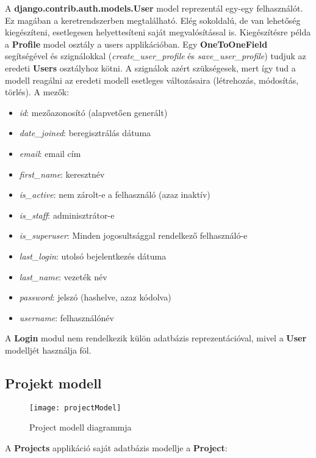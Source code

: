 A \textbf{django.contrib.auth.models.User} model reprezentál egy-egy felhasználót. Ez magában a keretrendszerben megtalálható. Elég sokoldalú, de van lehetőség kiegészíteni, esetlegesen helyettesíteni saját megvalósítással is. Kiegészítésre példa a \textbf{Profile} model osztály a users applikációban. Egy \textbf{OneToOneField} segítségével és szignálokkal (\textit{create\_user\_profile} és \textit{save\_user\_profile}) tudjuk az eredeti \textbf{Users} osztályhoz kötni. A szignálok azért szükségesek, mert így tud a modell reagálni az eredeti modell esetleges változásaira (létrehozás, módosítás, törlés). A mezők:

\begin{itemize}
	\item \textit{id}: mezőazonosító (alapvetően generált)
	\item \textit{date\_joined}: beregisztrálás dátuma
	\item \textit{email}: email cím
	\item \textit{first\_name}: keresztnév
	\item \textit{is\_active}: nem zárolt-e a felhasználó (azaz inaktív)
	\item \textit{is\_staff}: adminisztrátor-e
	\item \textit{is\_superuser}: Minden jogosultsággal rendelkező felhasználó-e
	\item \textit{last\_login}: utolsó bejelentkezés dátuma
	\item \textit{last\_name}: vezeték név
	\item \textit{password}: jelszó (hashelve, azaz kódolva)
	\item \textit{username}: felhasználónév
\end{itemize}

A \textbf{Login} modul nem rendelkezik külön adatbázis reprezentációval, mivel a \textbf{User} modelljét használja föl.

\subsection{Projekt modell}

\begin{figure}[H]
	\centering
	\texttt{[image: projectModel]}
	\caption{Project modell diagrammja}
	\label{fig:projectmodel}
\end{figure}

A \textbf{Projects} applikáció saját adatbázis modellje a \textbf{Project}:

